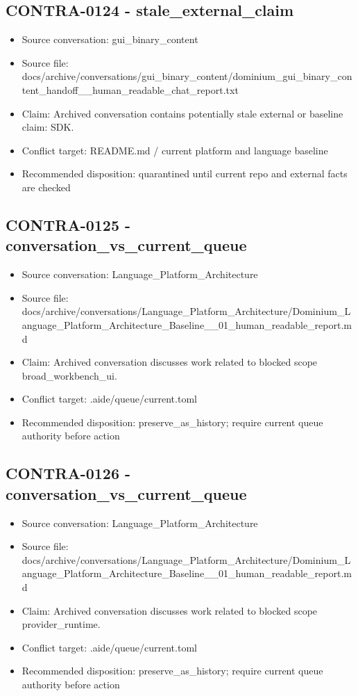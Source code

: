 \documentclass[11pt,a4paper]{report}
\begin{document}
\subsection{CONTRA-0124 - stale\_external\_claim}

\begin{itemize}
\item Source conversation: gui\_binary\_content
\item Source file: docs/archive/conversations/gui\_binary\_content/dominium\_gui\_binary\_content\_handoff\_\_human\_readable\_chat\_report.txt
\item Claim: Archived conversation contains potentially stale external or baseline claim: SDK.
\item Conflict target: README.md / current platform and language baseline
\item Recommended disposition: quarantined until current repo and external facts are checked
\end{itemize}

\subsection{CONTRA-0125 - conversation\_vs\_current\_queue}

\begin{itemize}
\item Source conversation: Language\_Platform\_Architecture
\item Source file: docs/archive/conversations/Language\_Platform\_Architecture/Dominium\_Language\_Platform\_Architecture\_Baseline\_\_01\_human\_readable\_report.md
\item Claim: Archived conversation discusses work related to blocked scope broad\_workbench\_ui.
\item Conflict target: .aide/queue/current.toml
\item Recommended disposition: preserve\_as\_history; require current queue authority before action
\end{itemize}

\subsection{CONTRA-0126 - conversation\_vs\_current\_queue}

\begin{itemize}
\item Source conversation: Language\_Platform\_Architecture
\item Source file: docs/archive/conversations/Language\_Platform\_Architecture/Dominium\_Language\_Platform\_Architecture\_Baseline\_\_01\_human\_readable\_report.md
\item Claim: Archived conversation discusses work related to blocked scope provider\_runtime.
\item Conflict target: .aide/queue/current.toml
\item Recommended disposition: preserve\_as\_history; require current queue authority before action
\end{itemize}
\end{document}
